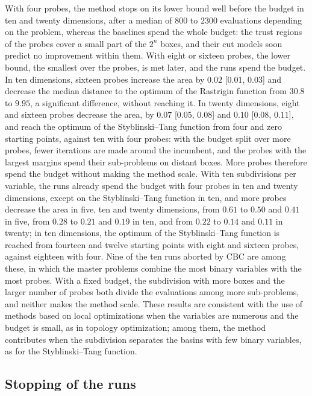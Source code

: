 \documentclass[pdflatex,sn-basic]{sn-jnl}
\begin{document}
With four probes, the method stops on its lower bound well before the budget in
ten and twenty dimensions, after a median of $800$ to $2300$ evaluations
depending on the problem, whereas the baselines spend the whole budget: the
trust regions of the probes cover a small part of the $2^n$ boxes, and their cut
models soon predict no improvement within them. With eight or sixteen probes,
the lower bound, the smallest over the probes, is met later, and the runs spend
the budget. In ten dimensions, sixteen probes increase the area by $0.02$
[$0.01$, $0.03$] and decrease the median distance to the optimum of the
Rastrigin function from $30.8$ to $9.95$, a significant difference, without
reaching it. In twenty dimensions, eight and sixteen probes decrease the area,
by $0.07$ [$0.05$, $0.08$] and $0.10$ [$0.08$, $0.11$], and reach the optimum of the
Styblinski--Tang function from four and zero starting points, against ten with
four probes: with the budget split over more probes, fewer iterations are made
around the incumbent, and the probes with the largest margins spend their
sub-problems on distant boxes. More probes therefore spend the budget without
making the method scale. With ten subdivisions per variable, the runs already
spend the budget with four probes in ten and twenty dimensions, except on the
Styblinski--Tang function in ten, and more probes decrease the area in five, ten and twenty dimensions,
from $0.61$ to $0.50$ and $0.41$ in five, from $0.28$ to $0.21$ and $0.19$ in ten,
and from $0.22$ to $0.14$ and $0.11$ in twenty; in ten dimensions, the optimum of
the Styblinski--Tang function is reached from fourteen and twelve starting
points with eight and sixteen probes, against eighteen with four. Nine of the
ten runs aborted by CBC are among these, in which the master problems combine
the most binary variables with the most probes. With a fixed budget, the
subdivision with more boxes and the larger number of probes both divide the
evaluations among more sub-problems, and neither makes the method scale.
These results are consistent with the use of methods based on local
optimizations when the variables are numerous and the budget is small, as in
topology optimization; among them, the method contributes when the subdivision
separates the basins with few binary variables, as for the Styblinski--Tang
function.

\subsection{Stopping of the runs}\label{sec:stopping-results}
\end{document}
